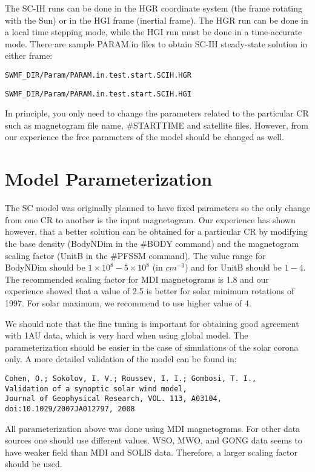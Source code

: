 The SC-IH runs can be done in the HGR coordinate system (the frame rotating 
with the Sun) or in the HGI frame (inertial frame). The HGR run can be done 
in a local time stepping mode, while the HGI run must be done in a 
time-accurate mode. There are sample PARAM.in files to obtain SC-IH 
steady-state solution in either frame:
\begin{verbatim}SWMF_DIR/Param/PARAM.in.test.start.SCIH.HGR\end{verbatim}
\begin{verbatim}SWMF_DIR/Param/PARAM.in.test.start.SCIH.HGI\end{verbatim}
In principle, you only need to change the parameters related to the particular 
CR such as magnetogram file name, \#STARTTIME and satellite files. However, 
from our experience the free parameters of the model should be changed as well.

\section{Model Parameterization \label{section:SCparameterization}}

The SC model was originally planned to have fixed parameters so the only 
change from one CR to another is the input magnetogram. Our experience has 
shown however, that a better solution can be obtained for a particular 
CR by modifying the base density (BodyNDim in the \#BODY command) and the 
magnetogram scaling factor (UnitB in the \#PFSSM command). The value 
range for BodyNDim should be $1\times10^8 - 5\times10^8$ (in $cm^{-3}$) 
and for UnitB should be $1-4$. The recommended scaling factor for MDI 
magnetograms is 1.8 and our experience showed that a value of 2.5 is 
better for solar minimum rotations of 1997. For solar maximum, we recommend 
to use higher value of 4. 

We should note that the fine tuning is important for obtaining good agreement 
with 1AU data, which is very hard when using global model. The 
parameterization should be easier in the case of simulations of the solar 
corona only. A more detailed validation of the model can be found in:
\begin{verbatim}Cohen, O.; Sokolov, I. V.; Roussev, I. I.; Gombosi, T. I., 
Validation of a synoptic solar wind model, 
Journal of Geophysical Research, VOL. 113, A03104, doi:10.1029/2007JA012797, 2008\end{verbatim}

All parameterization above was done using MDI magnetograms. For other data 
sources one should use different values. WSO, MWO, and GONG data seems to have 
weaker field than MDI and SOLIS data. Therefore, a larger scaling factor 
should be used. 
